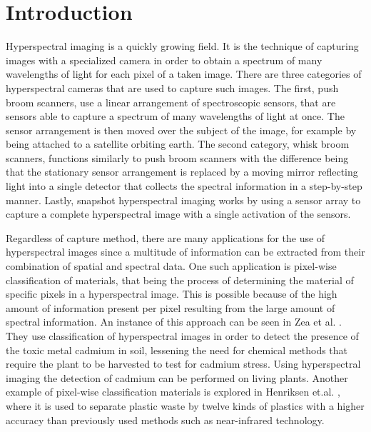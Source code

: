 \chapter{Introduction\label{cha:chapter1}}
Hyperspectral imaging is a quickly growing field. It is the technique of capturing images with a specialized camera in order to obtain a spectrum of many wavelengths of light for each pixel of a taken image. There are three categories of hyperspectral cameras that are used to capture such images. The first, push broom scanners, use a linear arrangement of spectroscopic sensors, that are sensors able to capture a spectrum of many wavelengths of light at once. The sensor arrangement is then moved over the subject of the image, for example by being attached to a satellite orbiting earth. The second category, whisk broom scanners, functions similarly to push broom scanners with the difference being that the stationary sensor arrangement is replaced by a moving mirror reflecting light into a single detector that collects the spectral information in a step-by-step manner. Lastly, snapshot hyperspectral imaging works by using a sensor array to capture a complete hyperspectral image with a single activation of the sensors. 

Regardless of capture method, there are many applications for the use of hyperspectral images since a multitude of information can be extracted from their combination of spatial and spectral data. One such application is pixel-wise classification of materials, that being the process of determining the material of specific pixels in a hyperspectral image. This is possible because of the high amount of information present per pixel resulting from the large amount of spectral information. An instance of this approach can be seen in Zea et al. \citep{zea_leveraging_2022}. They use classification of hyperspectral images in order to detect the presence of the toxic metal cadmium in soil, lessening the need for chemical methods that require the plant to be harvested to test for cadmium stress. Using hyperspectral imaging the detection of cadmium can be performed on living plants. Another example of pixel-wise classification materials is explored in Henriksen et.al. \citep{henriksen_plastic_2022}, where it is used to separate plastic waste by twelve kinds of plastics with a higher accuracy than previously used methods such as near-infrared technology.

